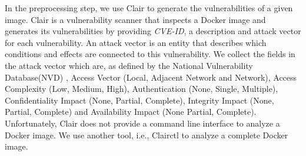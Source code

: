 In the preprocessing step, we use Clair to generate the vulnerabilities of a given image. Clair is a vulnerability scanner that inspects a Docker image and generates its vulnerabilities by providing \textit{CVE-ID}, a description and attack vector for each vulnerability. An attack vector is an entity that describes which conditions and effects are connected to this vulnerability. We collect the fields in the attack vector which are,  as defined by the National Vulnerability Database(NVD) \cite{booth2013national}, Access Vector (Local, Adjacent Network and Network), Access Complexity (Low, Medium, High), Authentication (None, Single, Multiple), Confidentiality Impact (None, Partial, Complete), Integrity Impact (None, Partial, Complete) and Availability Impact (None Partial, Complete). Unfortunately, Clair does not provide a command line interface to analyze a Docker image. We use another tool, i.e.,  Clairctl  to analyze a complete Docker image.

